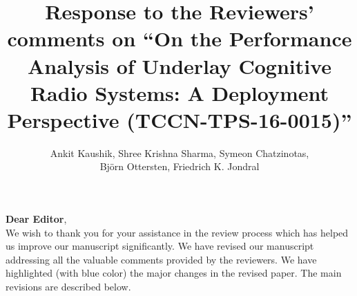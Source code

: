 \documentclass[12pt,a4wide,peerreview]{IEEEtran}
\begin{document}
\title{ \hsize=6.5in
Response to the Reviewers' comments on
``On the Performance Analysis of Underlay Cognitive Radio Systems: A Deployment Perspective (TCCN-TPS-16-0015)''}
\author{\baselineskip10pt
Ankit Kaushik, Shree Krishna Sharma, Symeon Chatzinotas, \\ Bj\"orn Ottersten, Friedrich K. Jondral
}
\maketitle
\baselineskip24pt
\textbf{Dear Editor},\\
 We wish to thank you for your assistance in the review process which has helped us improve our manuscript significantly. We have revised our manuscript addressing all the valuable comments provided by the reviewers. We have highlighted (with blue color) the major changes in the revised paper. The main revisions are described below.
\end{document}
